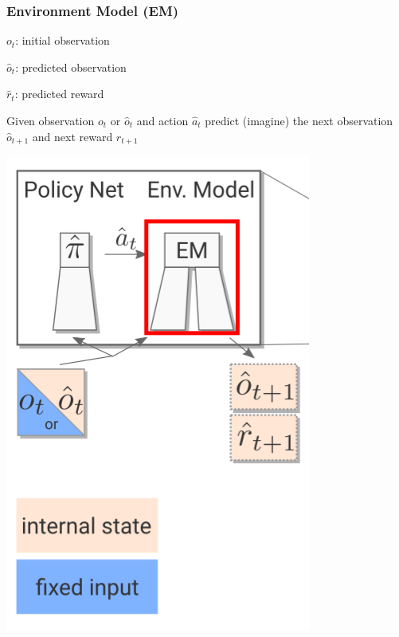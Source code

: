

\begin{frame}
    \frametitle{Environment Model (EM)}

\begin{multicols}{2}
	\begin{PraesentationAufzaehlung}
	\item $o_t$: initial observation
	\item $\hat{o}_t$: predicted observation
	\item $\hat{r}_t$: predicted reward
		\item Given observation $o_t$ or $\hat{o}_t$ and action $\hat{a}_t$ predict (imagine) the next observation $\hat{o}_{t+1}$ and next reward $\hat{r}_{t+1}$ 
	\end{PraesentationAufzaehlung}
    \vfill\columnbreak
	\begin{center}
    \includegraphics[height=0.5\textheight]{./Images/environment_model.png}%
	\end{center}
\end{multicols}
    
\end{frame}
\clearpage



